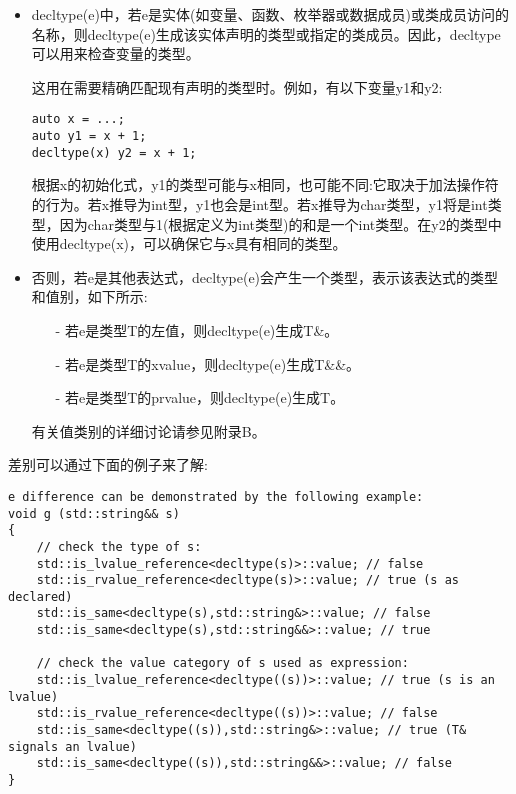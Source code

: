\begin{itemize}
\item 
decltype(e)中，若e是实体(如变量、函数、枚举器或数据成员)或类成员访问的名称，则decltype(e)生成该实体声明的类型或指定的类成员。因此，decltype可以用来检查变量的类型。

这用在需要精确匹配现有声明的类型时。例如，有以下变量y1和y2:

\begin{lstlisting}[style=styleCXX]
auto x = ...;
auto y1 = x + 1;
decltype(x) y2 = x + 1;
\end{lstlisting}

根据x的初始化式，y1的类型可能与x相同，也可能不同:它取决于加法操作符的行为。若x推导为int型，y1也会是int型。若x推导为char类型，y1将是int类型，因为char类型与1(根据定义为int类型)的和是一个int类型。在y2的类型中使用decltype(x)，可以确保它与x具有相同的类型。

\item 
否则，若e是其他表达式，decltype(e)会产生一个类型，表示该表达式的类型和值别，如下所示:

\begin{itemize}
\item[-]
若e是类型T的左值，则decltype(e)生成T\&。

\item[-]
若e是类型T的xvalue，则decltype(e)生成T\&\&。

\item[-]
若e是类型T的prvalue，则decltype(e)生成T。
\end{itemize}

有关值类别的详细讨论请参见附录B。

\end{itemize}

差别可以通过下面的例子来了解:

\begin{lstlisting}[style=styleCXX]
e difference can be demonstrated by the following example:
void g (std::string&& s)
{
	// check the type of s:
	std::is_lvalue_reference<decltype(s)>::value; // false
	std::is_rvalue_reference<decltype(s)>::value; // true (s as declared)
	std::is_same<decltype(s),std::string&>::value; // false
	std::is_same<decltype(s),std::string&&>::value; // true
	
	// check the value category of s used as expression:
	std::is_lvalue_reference<decltype((s))>::value; // true (s is an lvalue)
	std::is_rvalue_reference<decltype((s))>::value; // false
	std::is_same<decltype((s)),std::string&>::value; // true (T& signals an lvalue)
	std::is_same<decltype((s)),std::string&&>::value; // false
}
\end{lstlisting}

